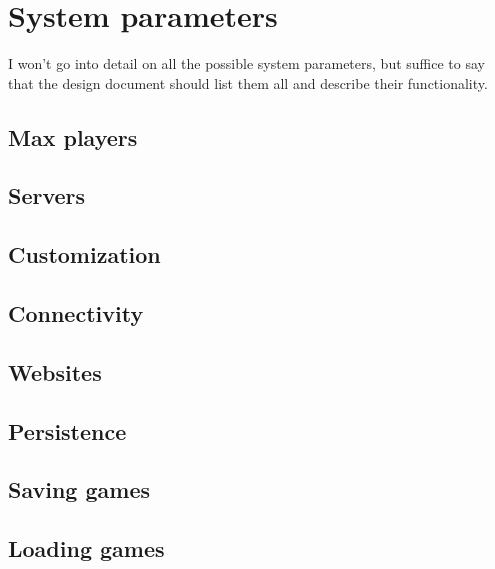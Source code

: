 \section{System parameters} %
I won't go into detail on all the possible system parameters, but suffice to say
that the design document should list them all and describe their functionality.

\subsection{Max players} %

\subsection{Servers} %

\subsection{Customization} %

\subsection{Connectivity} %

\subsection{Websites} %

\subsection{Persistence} %

\subsection{Saving games} %

\subsection{Loading games} %

